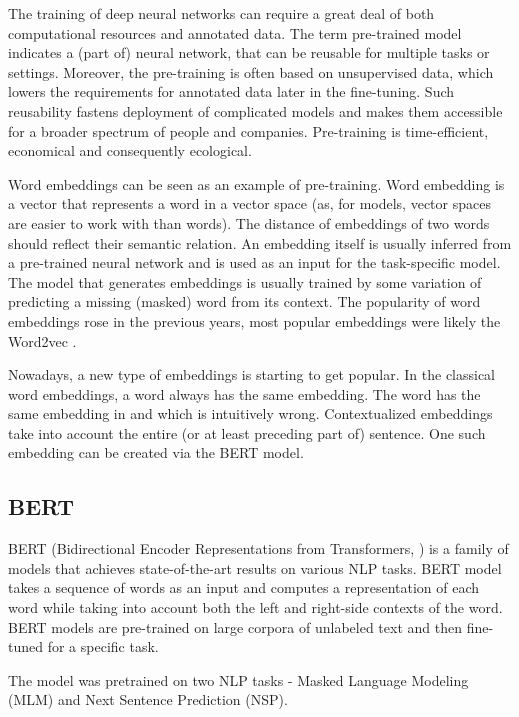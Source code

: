 The training of deep neural networks can require a great deal of both computational resources and annotated data. The term pre-trained model indicates a (part of) neural network, that can be reusable for multiple tasks or settings. Moreover, the pre-training is often based on unsupervised data, which lowers the requirements for annotated data later in the fine-tuning. Such reusability fastens deployment of complicated models and makes them accessible for a broader spectrum of people and companies. Pre-training is time-efficient, economical and consequently ecological.

Word embeddings can be seen as an example of pre-training. Word embedding is a vector that represents a word in a vector space (as, for models, vector spaces are easier to work with than words). The distance of embeddings of two words should reflect their semantic relation. An embedding itself is usually inferred from a pre-trained neural network and is used as an input for the task-specific model. The model that generates embeddings is usually trained by some variation of predicting a missing (masked) word from its context. The popularity of word embeddings rose in the previous years, most popular embeddings were likely the Word2vec \cite{mikolov2013word2vec}.  

Nowadays, a new type of embeddings is starting to get popular. In the classical word embeddings, a word always has the same embedding. The word  has the same embedding in  and  which is intuitively wrong. Contextualized embeddings take into account the entire (or at least preceding part of) sentence. One such embedding can be created via the BERT model.

\subsection{BERT}
\label{sec:bert}
BERT (Bidirectional Encoder Representations from Transformers, \cite{bert}) is a family of models that achieves state-of-the-art results on various NLP tasks. BERT model takes a sequence of words as an input and computes a representation of each word while taking into account both the left and right-side contexts of the word. BERT models are pre-trained on large corpora of unlabeled text and then fine-tuned for a specific task. 

The model was pretrained on two NLP tasks - Masked Language Modeling (MLM) and Next Sentence Prediction (NSP). 

